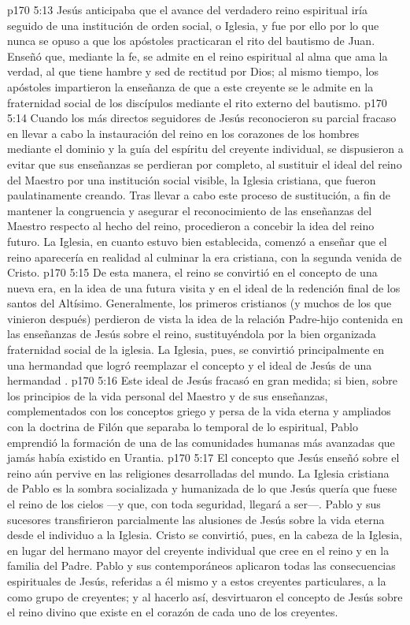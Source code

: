 \vs p170 5:13 Jesús anticipaba que el avance del verdadero reino espiritual iría seguido de una institución de orden social, o Iglesia, y fue por ello por lo que nunca se opuso a que los apóstoles practicaran el rito del bautismo de Juan. Enseñó que, mediante la fe, se admite en el reino espiritual al alma que ama la verdad, al que tiene hambre y sed de rectitud por Dios; al mismo tiempo, los apóstoles impartieron la enseñanza de que a este creyente se le admite en la fraternidad social de los discípulos mediante el rito externo del bautismo.
\vs p170 5:14 Cuando los más directos seguidores de Jesús reconocieron su parcial fracaso en llevar a cabo la instauración del reino en los corazones de los hombres mediante el dominio y la guía del espíritu del creyente individual, se dispusieron a evitar que sus enseñanzas se perdieran por completo, al sustituir el ideal del reino del Maestro por una institución social visible, la Iglesia cristiana, que fueron paulatinamente creando. Tras llevar a cabo este proceso de sustitución, a fin de mantener la congruencia y asegurar el reconocimiento de las enseñanzas del Maestro respecto al hecho del reino, procedieron a concebir la idea del reino futuro. La Iglesia, en cuanto estuvo bien establecida, comenzó a enseñar que el reino aparecería en realidad al culminar la era cristiana, con la segunda venida de Cristo.
\vs p170 5:15 De esta manera, el reino se convirtió en el concepto de una nueva era, en la idea de una futura visita y en el ideal de la redención final de los santos del Altísimo. Generalmente, los primeros cristianos (y muchos de los que vinieron después) perdieron de vista la idea de la relación Padre\hyp{}hijo contenida en las enseñanzas de Jesús sobre el reino, sustituyéndola por la bien organizada fraternidad social de la iglesia. La Iglesia, pues, se convirtió principalmente en una hermandad  que logró reemplazar el concepto y el ideal de Jesús de una hermandad .
\vs p170 5:16 Este ideal de Jesús fracasó en gran medida; si bien, sobre los principios de la vida personal del Maestro y de sus enseñanzas, complementados con los conceptos griego y persa de la vida eterna y ampliados con la doctrina de Filón que separaba lo temporal de lo espiritual, Pablo emprendió la formación de una de las comunidades humanas más avanzadas que jamás había existido en Urantia.
\vs p170 5:17 El concepto que Jesús enseñó sobre el reino aún pervive en las religiones desarrolladas del mundo. La Iglesia cristiana de Pablo es la sombra socializada y humanizada de lo que Jesús quería que fuese el reino de los cielos ---y que, con toda seguridad, llegará a ser---. Pablo y sus sucesores transfirieron parcialmente las alusiones de Jesús sobre la vida eterna desde el individuo a la Iglesia. Cristo se convirtió, pues, en la cabeza de la Iglesia, en lugar del hermano mayor del creyente individual que cree en el reino y en la familia del Padre. Pablo y sus contemporáneos aplicaron todas las consecuencias espirituales de Jesús, referidas a él mismo y a estos creyentes particulares, a la  como grupo de creyentes; y al hacerlo así, desvirtuaron el concepto de Jesús sobre el reino divino que existe en el corazón de cada uno de los creyentes.
